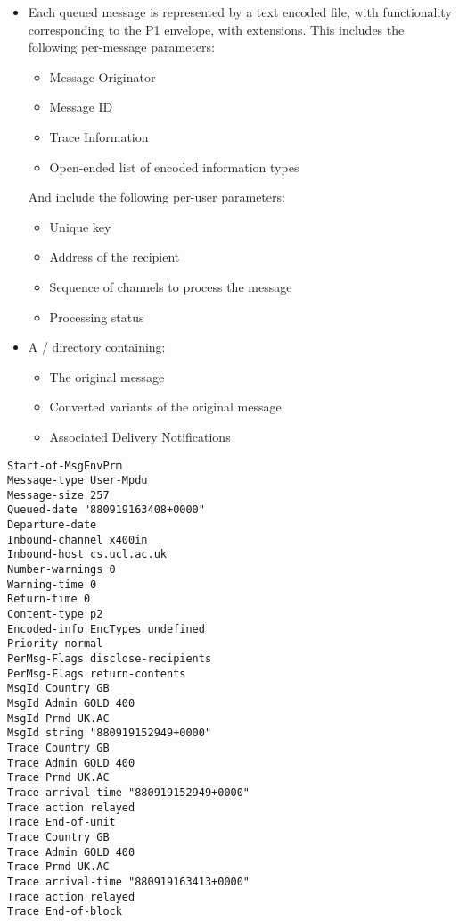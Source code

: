 \begin {bwslide}
\vspace{2ex}
\end {bwslide}


\begin {bwslide}
\begin {itemize}
\item Each queued message is represented by a text encoded file, with
functionality corresponding to the P1 envelope, with extensions. This
includes the following per-message parameters:
\begin {itemize}
\item Message Originator
\item Message ID
\item Trace Information
\item Open-ended list of encoded information types
\end {itemize}

And include the following per-user parameters:
\begin {itemize}
\item Unique key
\item Address of the recipient 
\item Sequence of channels to process the message
\item Processing status
\end {itemize}


\item A \unix/ directory containing:
\begin {itemize}
\item The original message
\item Converted variants of the original message
\item Associated Delivery Notifications
\end {itemize}

\end {itemize}

\end {bwslide}


\begin {bwslide}

\footnotesize
\begin {verbatim}
Start-of-MsgEnvPrm  
Message-type User-Mpdu  
Message-size 257  
Queued-date "880919163408+0000"  
Departure-date  
Inbound-channel x400in  
Inbound-host cs.ucl.ac.uk  
Number-warnings 0  
Warning-time 0  
Return-time 0  
Content-type p2  
Encoded-info EncTypes undefined  
Priority normal  
PerMsg-Flags disclose-recipients  
PerMsg-Flags return-contents  
MsgId Country GB  
MsgId Admin GOLD 400  
MsgId Prmd UK.AC  
MsgId string "880919152949+0000"
Trace Country GB  
Trace Admin GOLD 400  
Trace Prmd UK.AC  
Trace arrival-time "880919152949+0000"
Trace action relayed  
Trace End-of-unit  
Trace Country GB  
Trace Admin GOLD 400  
Trace Prmd UK.AC  
Trace arrival-time "880919163413+0000"  
Trace action relayed  
Trace End-of-block  
\end{verbatim}
\end {bwslide}


